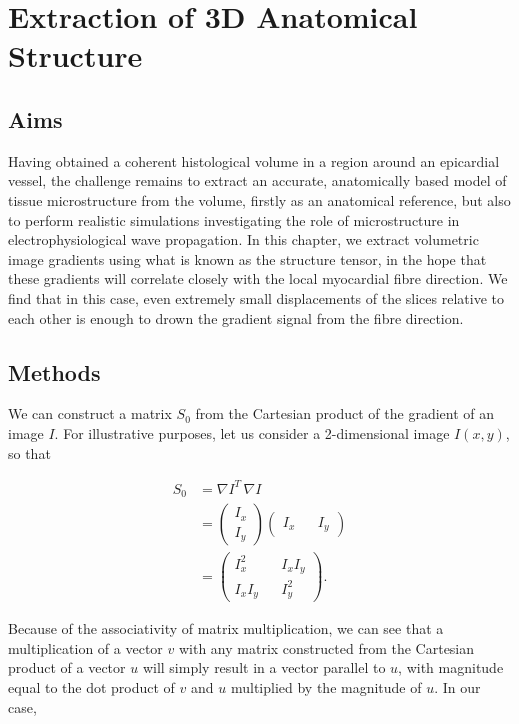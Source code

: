 \chapter{Extraction of 3D Anatomical Structure}
\dblspace

\section{Aims} %
\label{sec:aims}
  Having obtained a coherent histological volume in a region around an epicardial vessel, the challenge remains to extract an accurate, anatomically based model of tissue microstructure from the volume, firstly as an anatomical reference, but also to perform realistic simulations investigating the role of microstructure in electrophysiological wave propagation. In this chapter, we extract volumetric image gradients using what is known as the structure tensor, in the hope that these gradients will correlate closely with the local myocardial fibre direction. We find that in this case, even extremely small displacements of the slices relative to each other is enough to drown the gradient signal from the fibre direction.

\section{Methods} %
\label{sec:methods}
  We can construct a matrix $S_0$ from the Cartesian product of the gradient of an image $I$. For illustrative purposes, let us consider a 2-dimensional image $I(x,y)$, so that
  
  \begin{align}
    S_0 &= \nabla I^T \, \nabla I \\
        &= \begin{pmatrix}
      I_x \\
      I_y
    \end{pmatrix} \begin{pmatrix}
      I_x && I_y
    \end{pmatrix} \\
        &= \begin{pmatrix}
          I_x^2 && I_xI_y \\
          I_xI_y && I_y^2
        \end{pmatrix}.
  \end{align}
  
  Because of the associativity of matrix multiplication, we can see that a multiplication of a vector $v$ with any matrix constructed from the Cartesian product of a vector $u$ will simply result in a vector parallel to $u$, with magnitude equal to the dot product of $v$ and $u$ multiplied by the magnitude of $u$. In our case,
  
